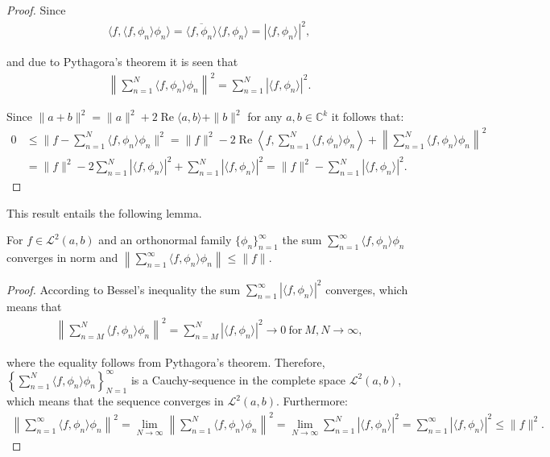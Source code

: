 \begin{proof}
Since
\begin{align*}
\langle f, \langle f,\phi_n \rangle \phi_n \rangle = \overline{\langle f,\phi_n \rangle} \langle f,\phi_n \rangle = |\langle f, \phi_n \rangle|^2,
\end{align*}

and due to Pythagora's theorem it is seen that
\begin{align*}
\left\|\sum_{n=1}^N \langle f, \phi_n \rangle \phi_n \right\|^2 = \sum_{n=1}^N |\langle f, \phi_n \rangle |^2.
\end{align*}

Since $\|a + b\|^2 = \|a\|^2 + 2 \operatorname{Re} \langle a,b  \rangle + \|b\|^2$ for any $a,b \in \mathbb{C}^k$ \cite{page 64, FAA} it follows that:
\begin{align*}
0 &\leq \|f - \sum_{n=1}^N \langle f, \phi_n \rangle \phi_n\|^2 = \|f\|^2 - 2\operatorname{Re} \left\langle f, \sum_{n=1}^N \langle f,\phi_n\rangle \phi_n \right\rangle + \left\|\sum_{n=1}^N \langle f, \phi_n \rangle \phi_n \right\|^2 \\
&= \|f\|^2 - 2\sum_{n=1}^N |\langle f, \phi_n \rangle |^2 + \sum_{n=1}^N |\langle f, \phi_n \rangle |^2 = \|f\|^2 - \sum_{n=1}^N |\langle f, \phi_n \rangle |^2.
\end{align*}
\end{proof}
\newpage
This result entails the following lemma.
\begin{lemma}
For $f \in \mathcal{L}^2(a,b)$ and an orthonormal family $\{\phi_n\}_{n=1}^\infty$ the sum $\sum_{n=1}^\infty \langle f,\phi_n \rangle \phi_n$ converges in norm and $\left\| \sum_{n=1}^\infty \langle f,\phi_n \rangle \phi_n \right\| \leq \|f\|$.
\end{lemma}

\begin{proof}
According to Bessel's inequality the sum $\sum_{n=1}^\infty | \langle f,\phi_n \rangle |^2$ converges, which means that
\begin{align*}
\left\|\sum_{n=M}^N \langle f, \phi_n \rangle \phi_n \right\|^2 = \sum_{n=M}^N |\langle f, \phi_n \rangle |^2 \to 0 \ \text{for} \ M,N \to \infty,
\end{align*}

where the equality follows from Pythagora's theorem. Therefore, $\left\{ \sum_{n=1}^N \langle f,\phi_n \rangle \phi_n \right\}_{N=1}^\infty$ is a Cauchy-sequence in the complete space $\mathcal{L}^2(a,b)$, which means that the sequence converges in $\mathcal{L}^2(a,b)$. Furthermore:
\begin{align*}
\left\|\sum_{n=1}^\infty \langle f, \phi_n \rangle \phi_n \right\|^2 = \lim_{N\to \infty} \left\|\sum_{n=1}^N \langle f, \phi_n \rangle \phi_n \right\|^2 = \lim_{N\to\infty} \sum_{n=1}^N | \langle f,\phi_n \rangle |^2 = \sum_{n=1}^\infty | \langle f,\phi_n \rangle |^2 \leq \|f\|^2.
\end{align*}
\end{proof}

